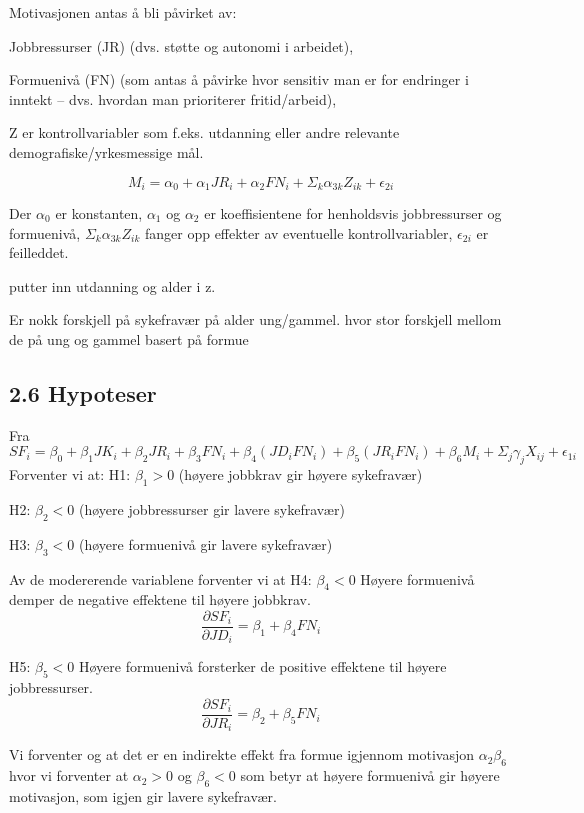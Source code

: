 \documentclass[
  12pt,
  a4paper,
  DIV=11,
  numbers=noendperiod]{scrartcl}
\begin{document}
Motivasjonen antas å bli påvirket av:

Jobbressurser (JR) (dvs. støtte og autonomi i arbeidet),

Formuenivå (FN) (som antas å påvirke hvor sensitiv man er for endringer
i inntekt -- dvs. hvordan man prioriterer fritid/arbeid),

Z er kontrollvariabler som f.eks. utdanning eller andre relevante
demografiske/yrkesmessige mål.

\[
M_i = \alpha_0 + \alpha_1 JR_i + \alpha_2 FN_i + \Sigma_k \alpha_{3k}Z_{ik} + \epsilon_{2i}
\]

Der \(\alpha_0\) er konstanten, \(\alpha_1\) og \(\alpha_2\) er
koeffisientene for henholdsvis jobbressurser og formuenivå,
\(\Sigma_k \alpha_{3k}Z_{ik}\) fanger opp effekter av eventuelle
kontrollvariabler, \(\epsilon_{2i}\) er feilleddet.

putter inn utdanning og alder i z.

Er nokk forskjell på sykefravær på alder ung/gammel. hvor stor forskjell
mellom de på ung og gammel basert på formue

\subsection{2.6 Hypoteser}\label{hypoteser}

Fra \[
SF_i = \beta_0 + \beta_1 JK_i + \beta_2 JR_i + \beta_3 FN_i + \beta_4 (JD_i FN_i) + \beta_5 (JR_i FN_i) + \beta_6 M_i + \Sigma_j \gamma_{j}X_{ij} + \epsilon_{1i}
\] Forventer vi at: H1: \(\beta_1 > 0\) (høyere jobbkrav gir høyere
sykefravær)

H2: \(\beta_2 < 0\) (høyere jobbressurser gir lavere sykefravær)

H3: \(\beta_3 < 0\) (høyere formuenivå gir lavere sykefravær)

Av de modererende variablene forventer vi at H4: \(\beta_4 < 0\) Høyere
formuenivå demper de negative effektene til høyere jobbkrav. \[
\frac{\partial SF_i}{\partial JD_i} = \beta_1 + \beta_4 FN_i
\]

H5: \(\beta_5 < 0\) Høyere formuenivå forsterker de positive effektene
til høyere jobbressurser. \[
\frac{\partial SF_i}{\partial JR_i} = \beta_2 + \beta_5 FN_i
\]

Vi forventer og at det er en indirekte effekt fra formue igjennom
motivasjon \(\alpha_2 \beta_6\) hvor vi forventer at \(\alpha_2 > 0\) og
\(\beta_6 < 0\) som betyr at høyere formuenivå gir høyere motivasjon,
som igjen gir lavere sykefravær.
\end{document}
